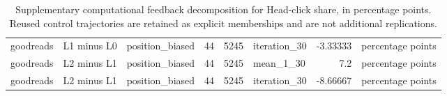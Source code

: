 \begin{table}[htbp!]
\begin{tabular}{lllrrlrl}
goodreads & L1 minus L0 & position\_biased & 44 & 5245 & iteration\_30 & -3.33333 & percentage points \\
goodreads & L2 minus L1 & position\_biased & 44 & 5245 & mean\_1\_30 & 7.2 & percentage points \\
goodreads & L2 minus L1 & position\_biased & 44 & 5245 & iteration\_30 & -8.66667 & percentage points \\
\hline
\end{tabular}
\caption{Supplementary computational feedback decomposition for Head-click share, in percentage points. Reused control trajectories are retained as explicit memberships and are not additional replications.}
\label{chap:results:tab:rq6_computational_l1_decomposition_table}
\end{table}
